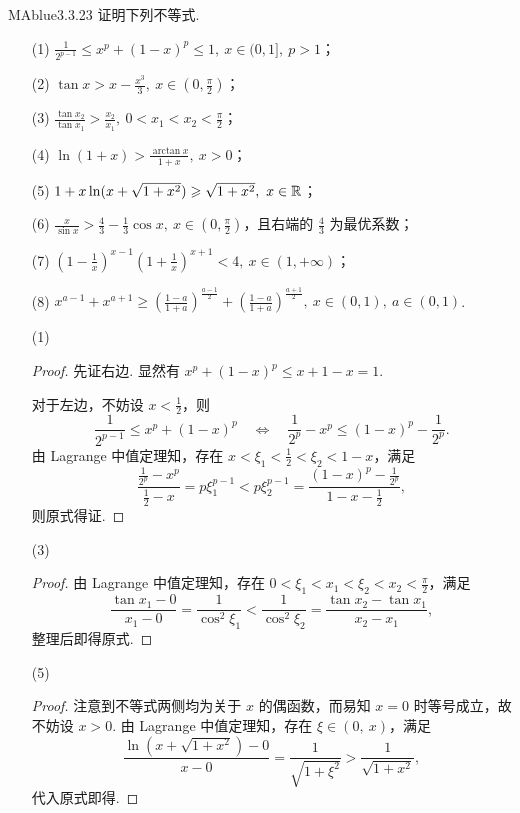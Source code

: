 \begin{problem}{MAblue}{3.3.23}
    证明下列不等式.
    \begin{enumerate}
        \item[(1)]
        $\frac 1 {2^{p-1}} \leqslant x^p + (1-x)^p \leqslant 1,\ x \in (0, 1],\ p > 1$；
        \item[(2)]
        $\tan x > x - \frac {x^3} 3,\ x \in \left( 0, \frac \pi 2 \right)$；
        \item[(3)]
        $\frac{\tan x_2}{\tan x_1} > \frac{x_2}{x_1},\ 0 < x_1 < x_2 < \frac \pi 2$；
        \item[(4)]
        $\ln(1+x) > \frac{\arctan x}{1+x},\ x > 0$；
        \item[(5)]
        $1 + x \ln(x+\sqrt{1+x^2}) \geqslant \sqrt{1+x^2},\ x \in \mathbb R$；
        \item[(6)]
        $\frac x {\sin x} > \frac 4 3 - \frac 1 3 \cos x,\ x \in \left( 0, \frac \pi 2 \right)$，且右端的 $\frac 4 3$ 为最优系数；
        \item[(7)]
        $\left( 1 - \frac 1 x \right)^{x-1} \left( 1 + \frac 1 x \right)^{x+1} < 4,\ x \in (1, +\infty)$；
        \item[(8)]
        $x^{a-1} + x^{a+1} \geqslant \left( \frac{1-a}{1+a} \right)^{\frac {a-1} 2} + \left( \frac{1-a}{1+a} \right)^{\frac {a+1} 2},\ x \in (0, 1),\ a \in (0, 1)$.
    \end{enumerate}
\end{problem}

\begin{enumerate}
    \item[(1)]
    \begin{proof}
        先证右边. 显然有 $x^p + (1-x)^p \leqslant x + 1-x = 1$.
    
        对于左边，不妨设 $x < \frac 1 2$，则
        \[
            \frac 1 {2^{p-1}} \leqslant x^p + (1-x)^p \quad \Leftrightarrow \quad \frac 1 {2^p} - x^p \leqslant (1-x)^p - \frac 1 {2^p}.
        \]
        由 Lagrange 中值定理知，存在 $x < \xi_1 < \frac 1 2 < \xi_2 < 1-x$，满足
        \[
            \frac{\frac 1 {2^p} - x^p}{\frac 1 2 - x} = p\xi_1^{p-1} < p\xi_2^{p-1} = \frac{(1-x)^p - \frac 1 {2^p}}{1-x-\frac 1 2},
        \]
        则原式得证.
    \end{proof}
    \item[(3)]
    \begin{proof}
        由 Lagrange 中值定理知，存在 $0 < \xi_1 < x_1 < \xi_2 < x_2 < \frac \pi 2$，满足
        \[
            \frac{\tan x_1-0}{x_1-0} = \frac 1 {\cos^2 \xi_1} < \frac 1 {\cos^2 \xi_2} = \frac{\tan x_2 - \tan x_1}{x_2 - x_1},
        \]
        整理后即得原式.
    \end{proof}
    \item[(5)]
    \begin{proof}
        注意到不等式两侧均为关于 $x$ 的偶函数，而易知 $x = 0$ 时等号成立，故不妨设 $x > 0$. 由 Lagrange 中值定理知，存在 $\xi \in (0,\ x)$，满足
        \[
            \frac{\ln\left( x+\sqrt{1+x^2} \right)-0}{x-0} = \frac 1 {\sqrt{1+\xi^2}} > \frac 1 {\sqrt{1+x^2}},
        \]
        代入原式即得.
    \end{proof}
\end{enumerate}

